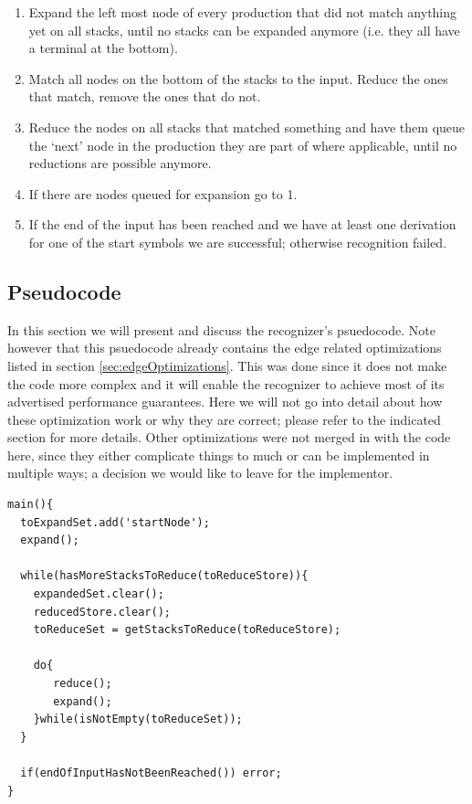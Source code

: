 \documentclass[a4paper,10pt]{article}
\begin{document}
\begin{enumerate}
 \setlength{\itemsep}{0pt}
 \setlength{\parskip}{0pt}
 \setlength{\parsep}{0pt}

 \item Expand the left most node of every production that did not match anything yet on all stacks, until no stacks can be expanded anymore (i.e. they all have a terminal at the bottom).
 \item Match all nodes on the bottom of the stacks to the input. Reduce the ones that match, remove the ones that do not.
 \item Reduce the nodes on all stacks that matched something and have them queue the `next' node in the production they are part of where applicable, until no reductions are possible anymore.
 \item If there are nodes queued for expansion go to 1.
 \item If the end of the input has been reached and we have at least one derivation for one of the start symbols we are successful; otherwise recognition failed.
\end{enumerate}

\pagebreak
\subsection{Pseudocode}

In this section we will present and discuss the recognizer's psuedocode. Note however that this psuedocode already contains the edge related optimizations listed in section \ref{sec:edgeOptimizations}. This was done since it does not make the code more complex and it will enable the recognizer to achieve most of its advertised performance guarantees. Here we will not go into detail about how these optimization work or why they are correct; please refer to the indicated section for more details. Other optimizations were not merged in with the code here, since they either complicate things to much or can be implemented in multiple ways; a decision we would like to leave for the implementor.

{\small
\begin{verbatim}
main(){
  toExpandSet.add('startNode');
  expand();
  
  while(hasMoreStacksToReduce(toReduceStore)){
    expandedSet.clear();
    reducedStore.clear();
    toReduceSet = getStacksToReduce(toReduceStore);
    
    do{
       reduce();
       expand();
    }while(isNotEmpty(toReduceSet));
  }
  
  if(endOfInputHasNotBeenReached()) error;
}
\end{verbatim}
}
\end{document}
